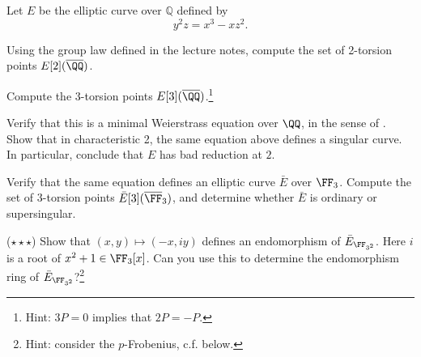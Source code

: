 \documentclass[../notes.tex]{subfiles}
\begin{document}
\begin{prob}
	Let $E$ be the elliptic curve over $\mathbb{Q}$ defined by
    \begin{equation*}
        \label{eq:y^2=x^3-x}
        y^2z = x^3 - xz^2.
    \end{equation*}
    \begin{listalph}
        \item Using the group law defined in the lecture notes, compute the set of 2-torsion points $E[2](\overline{\QQ})$.
        \item Compute the 3-torsion points $E[3](\overline{\QQ})$.\footnote{Hint: $3P = 0$ implies that $2P = -P$.}
        \item Verify that this is a minimal Weierstrass equation over $\QQ$, in the sense of \cite[Chapter VII]{Silverman2009}.
        Show that in characteristic 2, the same equation above defines a singular curve. In particular, conclude that $E$ has bad reduction at $2$. 
        
        \item Verify that the same equation defines an elliptic curve $\bar{E}$ over $\FF_3$. Compute the set of 3-torsion points $\bar{E}[3](\overline{\FF}_3)$, and determine whether $\bar{E}$ is ordinary or supersingular.
        \item ($\star \star \star$) Show that $(x,y)\mapsto (-x, iy)$ defines an endomorphism of $\bar{E}_{\FF_{3^2}}$. Here $i$ is a root of $x^2+1 \in \FF_3[x]$. Can you use this to determine the endomorphism ring of $\bar{E}_{\FF_{3^2}}$?\footnote{Hint: consider the $p$-Frobenius, c.f. below.}
    \end{listalph}
\end{prob}
\end{document}
